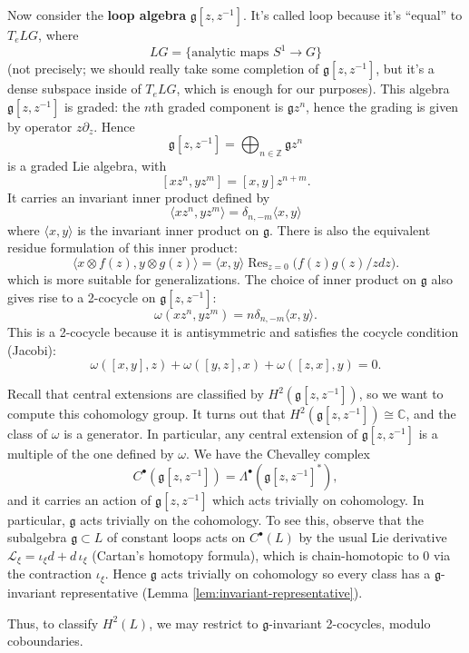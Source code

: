 \documentclass[12pt]{article}
\begin{document}
Now consider the \textbf{loop algebra} $\mathfrak{g}[z,z^{-1}]$. It's called loop because it's “equal” to $T_e LG$, where
\[
    LG = \{\text{analytic maps } S^1 \to G\}
\]
(not precisely; we should really take some completion of $\mathfrak{g}[z,z^{-1}]$, but it's a dense subspace inside of $T_e LG$, which is enough for our purposes). This algebra $\mathfrak{g}[z,z^{-1}]$ is graded: the $n$th graded component is $\mathfrak{g} z^n$, hence the grading is given by operator $z\partial_z$. Hence
\[
    \mathfrak{g}[z,z^{-1}] = \bigoplus_{n \in \mathbb{Z}} \mathfrak{g}z^n
\]
is a graded Lie algebra, with
\[
    [xz^n, yz^m] = [x,y] z^{n+m}.
\]
It carries an invariant inner product defined by
\[
    \langle xz^n, yz^m \rangle = \delta_{n,-m} \langle x,y \rangle
\] where $\langle x,y \rangle$ is the invariant inner product on $\mathfrak{g}$. There is also the equivalent residue formulation of this inner product:
\[
    \langle x\otimes f(z), y\otimes g(z) \rangle = \langle x,y \rangle \operatorname{Res}_{z=0}\bigg(f(z)g(z)/z dz\bigg).
\] which is more suitable for generalizations. The choice of inner product on $\mathfrak{g}$ also gives rise to a 2-cocycle on $\mathfrak{g}[z,z^{-1}]$:
\[
    \omega(xz^n, yz^m) = n \delta_{n,-m} \langle x,y \rangle.
\]
This is a 2-cocycle because it is antisymmetric and satisfies the cocycle condition (Jacobi):
\[
    \omega([x,y],z) + \omega([y,z],x) + \omega([z,x],y) = 0.
\]

Recall that central extensions are classified by $H^2(\mathfrak{g}[z,z^{-1}])$, so we want to compute this cohomology group. It turns out that $H^2(\mathfrak{g}[z,z^{-1}]) \cong \mathbb{C}$, and the class of $\omega$ is a generator. In particular, any central extension of $\mathfrak{g}[z,z^{-1}]$ is a multiple of the one defined by $\omega$. We have the Chevalley complex
\[
    C^\bullet(\mathfrak{g}[z,z^{-1}]) = \Lambda^\bullet(\mathfrak{g}[z,z^{-1}]^*),
\]
and it carries an action of $\mathfrak{g}[z,z^{-1}]$ which acts trivially on cohomology. In particular, $\mathfrak{g}$ acts trivially on the cohomology.
To see this, observe that the subalgebra $\mathfrak g\subset L$ of constant loops acts on $C^\bullet(L)$ by the usual Lie derivative
$\mathcal L_\xi = \iota_\xi d + d\,\iota_\xi$ (Cartan's homotopy formula), which is chain-homotopic to 0 via the contraction $\iota_\xi$.
Hence $\mathfrak g$ acts trivially on cohomology so every class has a $\mathfrak g$-invariant representative (Lemma \ref{lem:invariant-representative}).

Thus, to classify $H^2(L)$, we may restrict to $\mathfrak g$-invariant 2-cocycles, modulo coboundaries.
\end{document}
